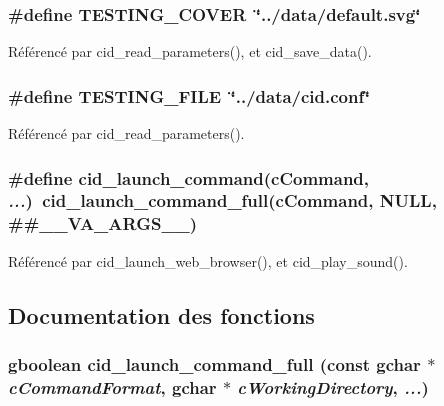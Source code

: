 \subsubsection{\setlength{\rightskip}{0pt plus 5cm}\#define TESTING\_\-COVER~\char`\"{}../data/default.svg\char`\"{}}\label{cid-utilities_8h_b29f702cca70ad9da81ec35918a4cdc5}




Référencé par cid\_\-read\_\-parameters(), et cid\_\-save\_\-data().
\subsubsection{\setlength{\rightskip}{0pt plus 5cm}\#define TESTING\_\-FILE~\char`\"{}../data/{\bf cid.conf}\char`\"{}}\label{cid-utilities_8h_fbd75720226b00bb2824f33e3572625e}




Référencé par cid\_\-read\_\-parameters().
\subsubsection{\setlength{\rightskip}{0pt plus 5cm}\#define cid\_\-launch\_\-command(cCommand, \/   {\em ...})~cid\_\-launch\_\-command\_\-full(cCommand, NULL, \#\#\_\-\_\-VA\_\-ARGS\_\-\_\-)}\label{cid-utilities_8h_19e3f47f335547e77d4b1887761c5c50}




Référencé par cid\_\-launch\_\-web\_\-browser(), et cid\_\-play\_\-sound().

\subsection{Documentation des fonctions}
\subsubsection{\setlength{\rightskip}{0pt plus 5cm}gboolean cid\_\-launch\_\-command\_\-full (const gchar $\ast$ {\em cCommandFormat}, \/  gchar $\ast$ {\em cWorkingDirectory}, \/   {\em ...})}\label{cid-utilities_8h_793b10ad44f8331ad6dc0775e1bfe01c}


